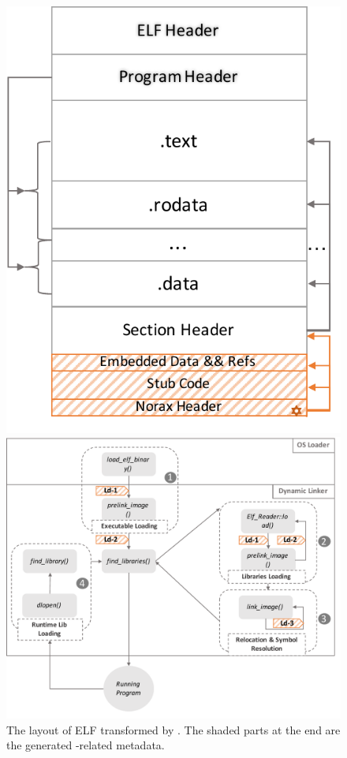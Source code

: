 \begin{figure}[t]
	\centering
	\begin{minipage}[b]{0.4\textwidth}
		\centering	
		\includegraphics[scale=0.50]{norax/figures/norax-elf}
		\caption{The layout of ELF transformed by \NORAX. The shaded parts at the end are the generated \NORAX-related metadata.}
		\label{fig:noraxelf}
	\end{minipage}
 	\hfill
	\begin{minipage}[b]{0.5\textwidth}
		\centering	
		\includegraphics[scale=0.46]{norax/figures/norax-ldflow}

\end{minipage}
\end{figure}
